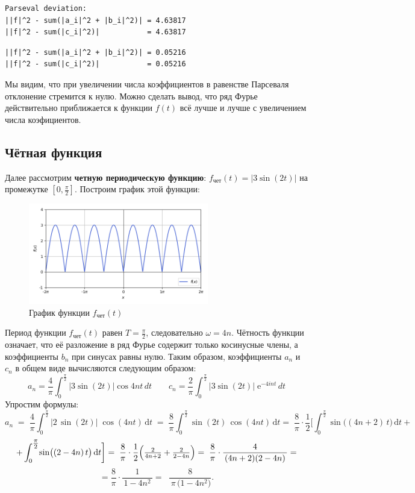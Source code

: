 \documentclass[a4paper]{article}
\newcommand{\e}{\;\text{e}}
\begin{document}
\begin{minipage}{0.48\textwidth}
\begin{lstlisting}[caption={Равенство Парсеваля при $n=1$}]
Parseval deviation:
||f|^2 - sum(|a_i|^2 + |b_i|^2)| = 4.63817
||f|^2 - sum(|c_i|^2)|           = 4.63817
\end{lstlisting}
\end{minipage}\hfill
\begin{minipage}{0.48\textwidth}
\begin{lstlisting}[caption={Равенство Парсеваля при $n=80$}, numbers=none]
||f|^2 - sum(|a_i|^2 + |b_i|^2)| = 0.05216
||f|^2 - sum(|c_i|^2)|           = 0.05216
\end{lstlisting}
\end{minipage}
Мы видим, что при увеличении числа коэффициентов в равенстве Парсеваля отклонение стремится к нулю. Можно сделать вывод, что ряд Фурье действительно приближается к функции $f(t)$ всё лучше и лучше с увеличением числа коэфициентов.

\subsection{Чётная функция}
Далее рассмотрим \textbf{четную периодическую функцию}: $f_\text{чет}(t) = |3\sin(2t)|$ на промежутке $\left[0, \frac{\pi}{2}\right]$. Построим график этой функции:
\begin{figure}[H]
    \centering 
    \includegraphics[width=0.7\textwidth]{even/func.png}
    \caption{График функции $f_\text{чет}(t)$}
\end{figure}

Период функции $f_\text{чет}(t)$ равен $T=\frac{\pi}{2}$, следовательно $\omega=4n$.
Чётность функции означает, что её разложение в ряд Фурье содержит только косинусные члены, а коэффициенты $b_n$ при синусах равны нулю. Таким образом, коэффициенты $a_n$ и $c_n$ в общем виде вычисляются следующим образом:
$$a_n = \frac{4}{\pi}\int_{0}^{\frac{\pi}{2}} |3\sin (2t)|\cos 4nt\,dt\qquad c_n = \frac{2}{\pi}\int_{0}^{\frac{\pi}{2}}|3\sin (2t)|\e^{-4int}\,dt$$
Упростим формулы:
$$a_n \;=\; \frac{4}{\pi}\int_{0}^{\tfrac{\pi}{2}}
   \bigl|2\,\sin(2t)\bigr|\;\cos(4nt)\,\mathrm{d}t
\;=\;
\frac{8}{\pi}\int_{0}^{\tfrac{\pi}{2}} \sin(2t)\,\cos(4nt)\,\mathrm{d}t = \;\frac{8}{\pi}\cdot \frac12 \biggl[\int_{0}^{\tfrac{\pi}{2}}\! \sin\bigl((4n+2)\,t\bigr)\,\mathrm{d}t + $$
$$+\int_{0}^{\tfrac{\pi}{2}}\! \sin\bigl((2-4n)\,t\bigr)\,\mathrm{d}t \biggr] =\;\frac{8}{\pi}\cdot \frac12\Bigl(\tfrac{2}{4n+2}+\tfrac{2}{2-4n}\Bigr)=\;\frac{8}{\pi}\cdot\frac{4}{\,(4n+2)(2-4n)\,}=$$
$$=\frac{8}{\pi}\cdot \frac{1}{\,1 - 4n^2\,}=\;\boxed{\;\frac{8}{\,\pi\,\bigl(1 - 4n^2\bigr)}.}$$
\end{document}
